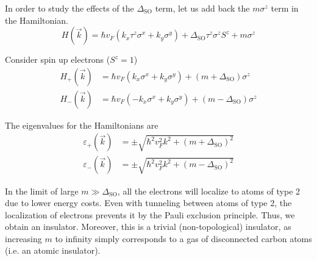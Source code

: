 \documentclass[12pt,a4paper,titlepage]{article}
\newcommand{\trm}[1]{\textrm{#1}} %
\begin{document}
In order to study the effects of the $\Delta_{\trm{SO}}$ term, let us add back the $m\sigma^{z}$ term in the Hamiltonian.
\begin{equation}
H(\vec{k})=\hbar v_{F}(k_{x}\tau^{z}\sigma^{x}+k_{y}\sigma^{y})+\Delta_{\trm{SO}}\tau^{z}\sigma^{z}S^{z}+m\sigma^{z}
\end{equation}

Consider spin up electrons ($S^{z}=1$)
\begin{equation}
\begin{aligned}
H_{+}(\vec{k})&=\hbar v_{F}(k_{x}\sigma^{x}+k_{y}\sigma^{y})+(m+\Delta_{\trm{SO}})\sigma^{z}\\
H_{-}(\vec{k})&=\hbar v_{F}(-k_{x}\sigma^{x}+k_{y}\sigma^{y})+(m-\Delta_{\trm{SO}})\sigma^{z}
\end{aligned}
\end{equation}

The eigenvalues for the Hamiltonians are
\begin{equation}
\begin{aligned}
\varepsilon_{+}(\vec{k})&=\pm\sqrt{\hbar^{2}v_{F}^{2}k^{2}+(m+\Delta_{\trm{SO}})^{2}}\\
\varepsilon_{-}(\vec{k})&=\pm\sqrt{\hbar^{2}v_{F}^{2}k^{2}+(m-\Delta_{\trm{SO}})^{2}}
\end{aligned}
\end{equation}

In the limit of large $m\gg\Delta_{\trm{SO}}$, all the electrons will localize to atoms of type 2 due to lower energy costs. Even with tunneling between atoms of type 2, the localization of electrons prevents it by the Pauli exclusion principle. Thus, we obtain an insulator. Moreover, this is a trivial (non-topological) insulator, as increasing $m$ to infinity simply corresponds to a gas of disconnected carbon atoms (i.e. an atomic insulator).
\begin{center}
\end{center}
\end{document}
